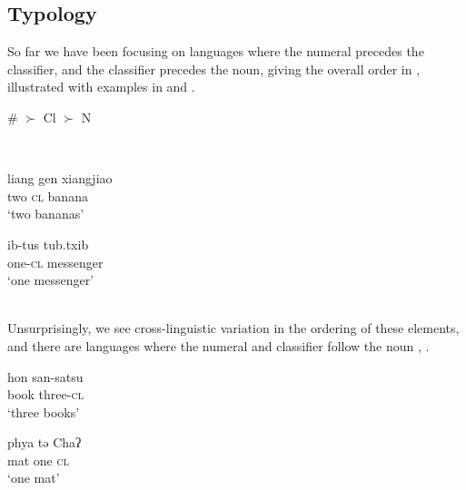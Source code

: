 \documentclass[output=paper
,modfonts
,nonflat]{langsci/langscibook}
\begin{document}
\subsection{Typology}

So far we have been focusing on languages where the numeral precedes the classifier, and the classifier precedes the noun, giving the overall order in , illustrated with examples in  and .

\noindent\begin{minipage}[t]{.5\linewidth}
\ea \label{ex:hall:48}
\# $\succ$ Cl $\succ$ N
\z
\end{minipage} \\

\noindent\begin{minipage}[t]{.49\linewidth}
\ea \label{ex:hall:49}
\gll liang gen xiangjiao \\
two \textsc{cl} banana \\
\glt `two bananas'
\z 
\end{minipage}%
\begin{minipage}[t]{.51\linewidth}
\ea \label{ex:hall:50}
\gll
ib-tus tub.txib \\
one-\textsc{cl} messenger \\
\glt `one messenger'
\z
\end{minipage}\\

Unsurprisingly, we see cross-linguistic variation in the ordering of these elements, and there are languages where the numeral and classifier follow the noun , .\\

\noindent\begin{minipage}{.5\linewidth}
\ea \label{ex:hall:51}
\gll
hon san-satsu \\
book three-\textsc{cl} \\
\glt
`three books'
\z
\end{minipage}%
\begin{minipage}{.5\linewidth}
\ea \label{ex:hall:52}
\gll
phya tə Chaʔ \\
mat one \textsc{cl} \\
\glt 
`one mat'
\z
\end{minipage}\\
\end{document}
